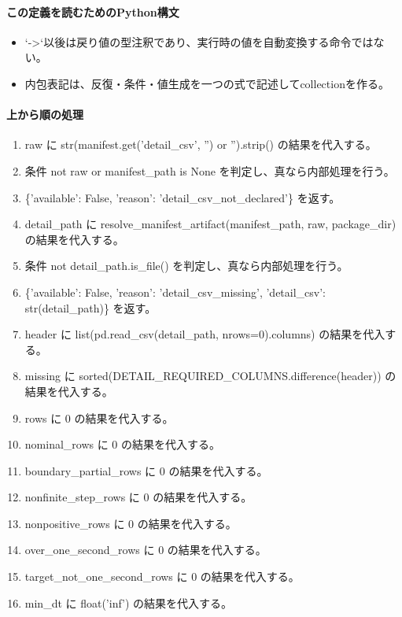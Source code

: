 \documentclass[a4paper,11pt]{article}
\begin{document}
            \paragraph{この定義を読むためのPython構文}
            \begin{itemize}[leftmargin=1.6em]
            \item `->`以後は戻り値の型注釈であり、実行時の値を自動変換する命令ではない。
\item 内包表記は、反復・条件・値生成を一つの式で記述してcollectionを作る。
            \end{itemize}
            \paragraph{上から順の処理}
            \begin{enumerate}[leftmargin=1.8em]
            \item raw に str(manifest.get('detail\_csv', '') or '').strip() の結果を代入する。
\item 条件 not raw or manifest\_path is None を判定し、真なら内部処理を行う。
\item   \{'available': False, 'reason': 'detail\_csv\_not\_declared'\} を返す。
\item detail\_path に resolve\_manifest\_artifact(manifest\_path, raw, package\_dir) の結果を代入する。
\item 条件 not detail\_path.is\_file() を判定し、真なら内部処理を行う。
\item   \{'available': False, 'reason': 'detail\_csv\_missing', 'detail\_csv': str(detail\_path)\} を返す。
\item header に list(pd.read\_csv(detail\_path, nrows=0).columns) の結果を代入する。
\item missing に sorted(DETAIL\_REQUIRED\_COLUMNS.difference(header)) の結果を代入する。
\item rows に 0 の結果を代入する。
\item nominal\_rows に 0 の結果を代入する。
\item boundary\_partial\_rows に 0 の結果を代入する。
\item nonfinite\_step\_rows に 0 の結果を代入する。
\item nonpositive\_rows に 0 の結果を代入する。
\item over\_one\_second\_rows に 0 の結果を代入する。
\item target\_not\_one\_second\_rows に 0 の結果を代入する。
\item min\_dt に float('inf') の結果を代入する。

\end{enumerate}
\end{document}
